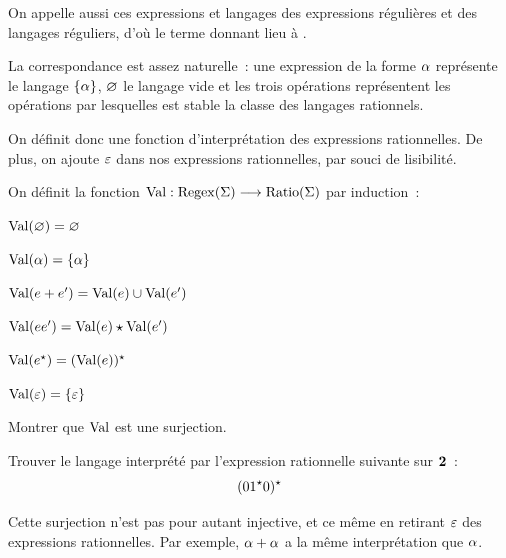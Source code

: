 \begin{remark}
  On appelle aussi ces expressions et langages des expressions régulières et des
  langages réguliers, d'où le terme  donnant
  lieu à .
\end{remark}

La correspondance est assez naturelle~: une expression de la forme $\alpha$
représente le langage $\{\alpha\}$, $\varnothing$ le langage vide et les trois
opérations représentent les opérations par lesquelles est stable la classe des
langages rationnels.

On définit donc une fonction d'interprétation des expressions rationnelles. De
plus, on ajoute $\varepsilon$ dans nos expressions rationnelles, par souci de
lisibilité.

\begin{definition}
  On définit la fonction $\operatorname{Val} : \displaystyle \operatorname{Regex}(\Sigma) \longrightarrow \operatorname{Ratio}(\Sigma)$ par
  induction~:
  \vspace{0.1cm}
  \begin{itemize}
    \begin{minipage}{0.45\textwidth}
    \item $\operatorname{Val}(\varnothing) = \varnothing$
    \item $\operatorname{Val}(\alpha) = \{\alpha\}$
    \item $\operatorname{Val}(e+e') = \operatorname{Val}(e) \cup \operatorname{Val}(e')$
    \end{minipage}
    \begin{minipage}{0.45\textwidth}
    \item $\operatorname{Val}(ee') = \operatorname{Val}(e) \mathbin{\star} \operatorname{Val}(e')$
    \item $\operatorname{Val}(e^{\star}) = (\operatorname{Val}(e))^{\star}$
    \item $\operatorname{Val}(\varepsilon) = \{\varepsilon\}$
    \end{minipage}
  \end{itemize}
\end{definition}

\begin{exercise}
  Montrer que $\operatorname{Val}$ est une surjection.
\end{exercise}

\begin{exercise}
  Trouver le langage interprété par l'expression rationnelle suivante sur
  $\bm{2}$~:
  \[(01^{\star} 0)^{\star}\]
\end{exercise}

\begin{remark}
  Cette surjection n'est pas pour autant injective, et ce même en retirant
  $\varepsilon$ des expressions rationnelles. Par exemple, $\alpha + \alpha$ a la même
  interprétation que $\alpha$.
\end{remark}

